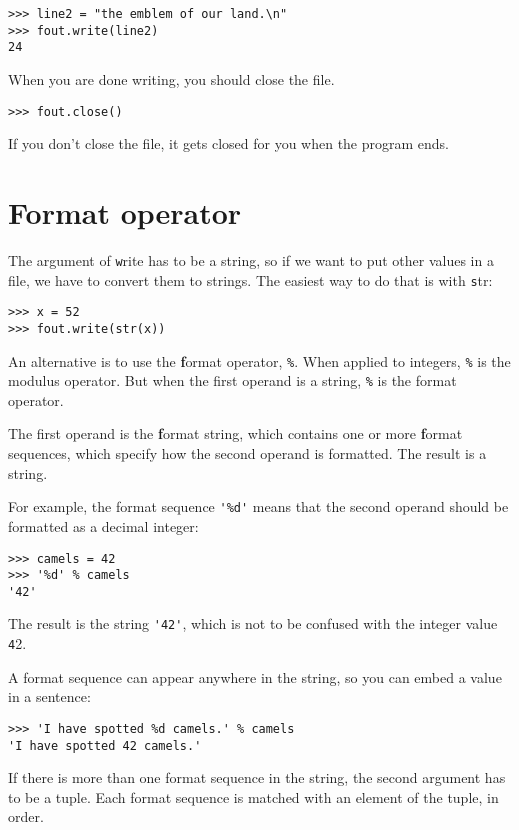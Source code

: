 \documentclass[
DIV=11,
fontsize=12,
twoside,
headinclude=false,
titlepage=firstiscover,
abstract=true,
headsepline=true,
footsepline=true,
chapterprefix=true, %
headings=big,
bibliography=totoc,%
captions=tableheading
]{scrbook}
\theoremstyle{definition}
\begin{document}
\begin{lstlisting}
>>> line2 = "the emblem of our land.\n"
>>> fout.write(line2)
24
\end{lstlisting}
%
When you are done writing, you should close the file.

\begin{lstlisting}
>>> fout.close()
\end{lstlisting}
%
%
If you don't close the file, it gets closed for you when the
program ends.


\section{Format operator}

The argument of {\texttt write} has to be a string, so if we want
to put other values in a file, we have to convert them to
strings.  The easiest way to do that is with {\texttt str}:

\begin{lstlisting}
>>> x = 52
>>> fout.write(str(x))
\end{lstlisting}
%
An alternative is to use the {\textbf format operator}, {\texttt \%}.  When
applied to integers, {\texttt \%} is the modulus operator.  But
when the first operand is a string, {\texttt \%} is the format operator.

The first operand is the {\textbf format string}, which contains
one or more {\textbf format sequences}, which
specify how
the second operand is formatted.  The result is a string.

For example, the format sequence \verb"'%d'" means that
the second operand should be formatted as a decimal
integer:

\begin{lstlisting}
>>> camels = 42
>>> '%d' % camels
'42'
\end{lstlisting}
%
The result is the string \verb"'42'", which is not to be confused
with the integer value {\texttt 42}.

A format sequence can appear anywhere in the string,
so you can embed a value in a sentence:

\begin{lstlisting}
>>> 'I have spotted %d camels.' % camels
'I have spotted 42 camels.'
\end{lstlisting}
%
If there is more than one format sequence in the string,
the second argument has to be a tuple.  Each format sequence is
matched with an element of the tuple, in order.
\end{document}
